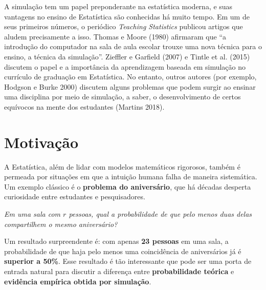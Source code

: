 \documentclass[
  letterpaper,
  DIV=11,
  numbers=noendperiod]{scrreprt}
\begin{document}
A simulação tem um papel preponderante na estatística moderna, e suas
vantagens no ensino de Estatística são conhecidas há muito tempo. Em um
de seus primeiros números, o periódico \emph{Teaching Statistics}
publicou artigos que aludem precisamente a isso. Thomas e Moore (1980)
afirmaram que ``a introdução do computador na sala de aula escolar
trouxe uma nova técnica para o ensino, a técnica da simulação''.
Zieffler e Garfield (2007) e Tintle et al. (2015) discutem o papel e a
importância da aprendizagem baseada em simulação no currículo de
graduação em Estatística. No entanto, outros autores (por exemplo,
Hodgson e Burke 2000) discutem alguns problemas que podem surgir ao
ensinar uma disciplina por meio de simulação, a saber, o desenvolvimento
de certos equívocos na mente dos estudantes (Martins 2018).


\chapter{Motivação}\label{motivauxe7uxe3o}

A Estatística, além de lidar com modelos matemáticos rigorosos, também é
permeada por situações em que a intuição humana falha de maneira
sistemática. Um exemplo clássico é o \textbf{problema do aniversário},
que há décadas desperta curiosidade entre estudantes e pesquisadores.

\begin{tcolorbox}[enhanced jigsaw, coltitle=black, bottomtitle=1mm, toprule=.15mm, arc=.35mm, colframe=quarto-callout-tip-color-frame, breakable, opacityback=0, bottomrule=.15mm, rightrule=.15mm, titlerule=0mm, toptitle=1mm, title=\textcolor{quarto-callout-tip-color}{\faLightbulb}\hspace{0.5em}{Enuciado}, leftrule=.75mm, opacitybacktitle=0.6, left=2mm, colback=white, colbacktitle=quarto-callout-tip-color!10!white]

\emph{Em uma sala com \(r\) pessoas, qual a probabilidade de que pelo
menos duas delas compartilhem o mesmo aniversário?}

\end{tcolorbox}

Um resultado surpreendente é: com apenas \textbf{23 pessoas} em uma
sala, a probabilidade de que haja pelo menos uma coincidência de
aniversários já é \textbf{superior a 50\%}. Esse resultado é tão
interessante que pode ser uma porta de entrada natural para discutir a
diferença entre \textbf{probabilidade teórica} e \textbf{evidência
empírica obtida por simulação}.
\end{document}
